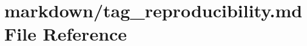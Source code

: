 \hypertarget{tag__reproducibility_8md}{}\section{markdown/tag\+\_\+reproducibility.md File Reference}
\label{tag__reproducibility_8md}
